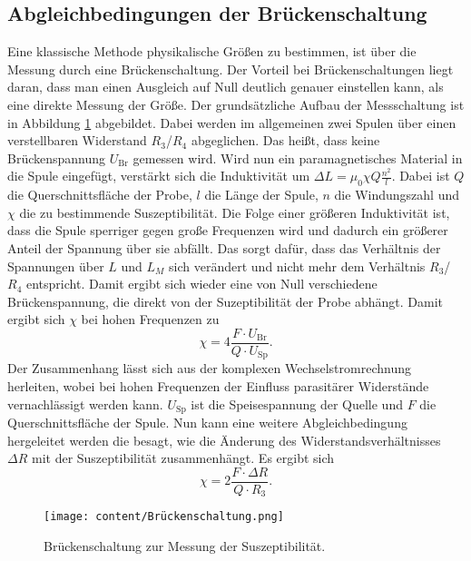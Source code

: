 \subsection{Abgleichbedingungen der Brückenschaltung}
Eine klassische Methode physikalische Größen zu bestimmen, ist über die Messung durch eine Brückenschaltung.
Der Vorteil bei Brückenschaltungen liegt daran, dass man einen Ausgleich auf Null deutlich genauer einstellen kann, als eine direkte Messung der Größe.
Der grundsätzliche Aufbau der Messschaltung ist in Abbildung \ref{fig:Brücke} abgebildet. Dabei werden im allgemeinen zwei Spulen über einen verstellbaren Widerstand
$R_3$/$R_4$ abgeglichen. Das heißt, dass keine Brückenspannung $U_\text{Br}$ gemessen wird. Wird nun ein paramagnetisches Material in 
die Spule eingefügt, verstärkt sich die Induktivität um $\Delta L=\mu_0\chi Q \frac{n^2}{l}$. Dabei ist $Q$ die Querschnittsfläche der Probe, $l$ die Länge der Spule,
$n$ die Windungszahl und $\chi$ die zu bestimmende Suszeptibilität. Die Folge einer größeren Induktivität ist, dass die Spule sperriger
gegen große Frequenzen wird und dadurch ein größerer Anteil der Spannung über sie abfällt. Das sorgt dafür, dass das Verhältnis der Spannungen über $L$ und $L_M$
sich verändert und nicht mehr dem Verhältnis $R_3$/$R_4$ entspricht. Damit ergibt sich wieder eine von Null verschiedene Brückenspannung, die direkt von
der Suzeptibilität der Probe abhängt. Damit ergibt sich $\chi$ bei hohen Frequenzen zu
\begin{equation}
    \chi= 4 \frac{F\cdot U_\text{Br}}{Q\cdot U_\text{Sp}}.
    \label{eq:chiU}
\end{equation}
Der Zusammenhang lässt sich aus der komplexen Wechselstromrechnung herleiten, wobei bei hohen Frequenzen der Einfluss
parasitärer Widerstände vernachlässigt werden kann. $U_\text{Sp}$ ist die Speisespannung der Quelle und $F$ die Querschnittsfläche der Spule.
Nun kann eine weitere Abgleichbedingung hergeleitet werden die besagt, wie die Änderung des Widerstandsverhältnisses $\Delta R$ mit der Suszeptibilität 
zusammenhängt. Es ergibt sich
\begin{equation}
    \chi= 2 \frac{F\cdot \Delta R}{Q\cdot R_3}.
    \label{eq:chiR}
\end{equation}
\begin{figure}[H]
    \centering
    \texttt{[image: content/Brückenschaltung.png]}
    \caption{Brückenschaltung zur Messung der Suszeptibilität.}
    \label{fig:Brücke}
\end{figure}

\cite{sample}
